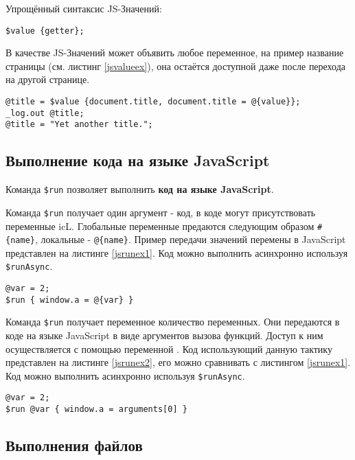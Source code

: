 \documentclass[a4paper, 14pt]{extarticle}
\begin{document}
Упрощённый синтаксис JS-Значений:
\begin{lstlisting}[numbers=none]
$value {getter};
\end{lstlisting}

В качестве JS-Значений может объявить любое переменное, на пример название страницы (см. листинг \ref{jsvalueex}), она остаётся доступной даже после перехода на другой странице.

\begin{lstlisting}[caption=Использование JS-Значений, label=jsvalueex]
@title = $value {document.title, document.title = @{value}};
_log.out @title;
@title = "Yet another title.";
\end{lstlisting}

\subsection{Выполнение кода на языке JavaScript}

Команда \lstinline|$run| позволяет выполнить {\bf код на языке JavaScript}.

\code{[icL]} Команда \lstinline|$run| получает один аргумент - код, в коде могут присутствовать переменные icL. Глобальные переменные предаются следующим образом \lstinline|#{name}|, локальные - \lstinline|@{name}|. Пример передачи значений перемены в JavaScript представлен на листинге \ref{jsrunex1}. Код можно выполнить асинхронно используя \lstinline|$runAsync|.

\begin{lstlisting}[caption=Выполнение кода на языке JavaScript (icL), label=jsrunex1]
@var = 2;
$run { window.a = @{var} }
\end{lstlisting}

\code{[w3c]} Команда \lstinline|$run| получает переменное количество переменных. Они передаются в коде на языке JavaScript в виде аргументов вызова функций. Доступ к ним осуществляется с помощью переменной . Код использующий данную тактику представлен на листинге \ref{jsrunex2}, его можно сравнивать с листингом \ref{jsrunex1}. Код можно выполнить асинхронно используя \lstinline|$runAsync|.

\begin{lstlisting}[caption=Выполнение кода на языке JavaScript (w3c), label=jsrunex2]
@var = 2;
$run @var { window.a = arguments[0] }
\end{lstlisting}

\subsection{Выполнения файлов}
\end{document}
